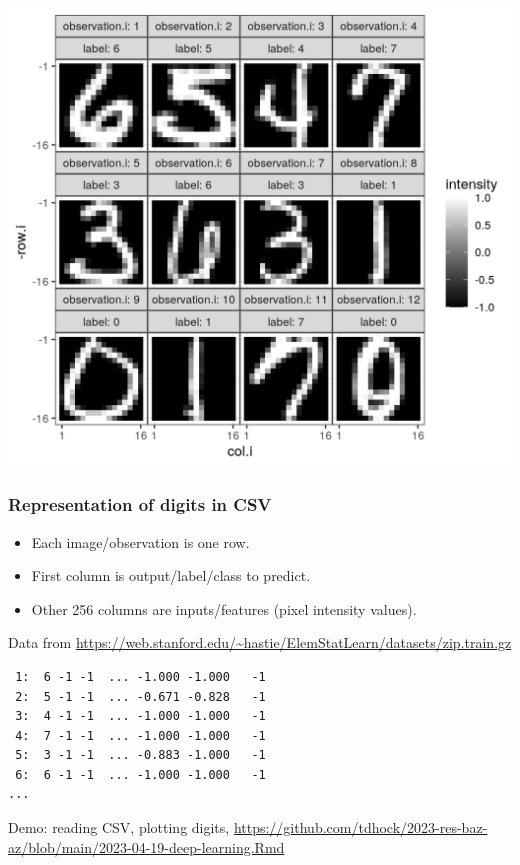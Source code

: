 \documentclass{beamer}
\begin{document}
\begin{frame}
  \includegraphics[height=\textheight]{figure-validation-loss-digits}
\end{frame}

\begin{frame}[fragile]
  \frametitle{Representation of digits in CSV}

  \begin{itemize}
  \item Each image/observation is one row.
  \item First column is output/label/class to predict.
  \item Other 256 columns are inputs/features (pixel intensity
    values).
  \end{itemize}
 Data from {\scriptsize \url{https://web.stanford.edu/~hastie/ElemStatLearn/datasets/zip.train.gz}}

\begin{verbatim}
 1:  6 -1 -1  ... -1.000 -1.000   -1
 2:  5 -1 -1  ... -0.671 -0.828   -1
 3:  4 -1 -1  ... -1.000 -1.000   -1
 4:  7 -1 -1  ... -1.000 -1.000   -1
 5:  3 -1 -1  ... -0.883 -1.000   -1
 6:  6 -1 -1  ... -1.000 -1.000   -1
...
\end{verbatim}

Demo: reading CSV, plotting digits, \url{https://github.com/tdhock/2023-res-baz-az/blob/main/2023-04-19-deep-learning.Rmd}
  
\end{frame}
\end{document}

